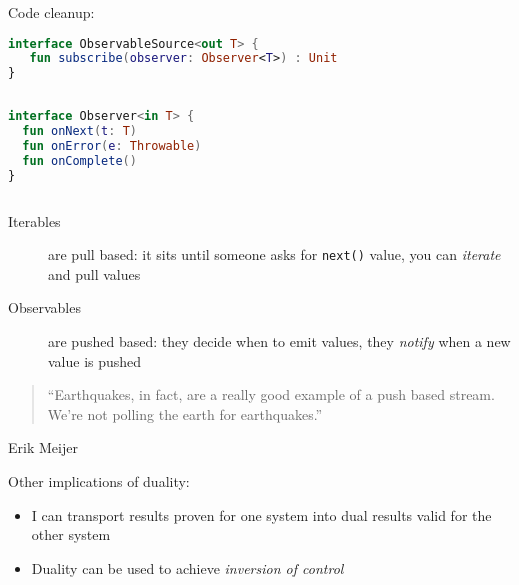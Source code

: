 \documentclass[10pt]{beamer}
\begin{document}
\begin{frame}[fragile]
Code cleanup:
\begin{lstlisting}[language=Kotlin, basicstyle=\ttfamily]
interface ObservableSource<out T> {
   fun subscribe(observer: Observer<T>) : Unit
}
\end{lstlisting}
\begin{columns}
\begin{column}{0.7\textwidth}
\begin{lstlisting}[language=Kotlin, basicstyle=\ttfamily]
interface Observer<in T> {
  fun onNext(t: T)
  fun onError(e: Throwable)
  fun onComplete()
}
\end{lstlisting}
\end{column}
\begin{column}{0.29\textwidth}
	\end{column}
\end{columns}

\end{frame}



\begin{frame}[fragile]
	\begin{description}
		\item[Iterables] are pull based: it sits until someone asks for \verb|next()| value, you can \emph{iterate} and pull values
		\item[Observables] are pushed based: they decide when to emit values, they \emph{notify} when a new value is pushed
	\end{description}
	\begin{quotation}
		``Earthquakes, in fact, are a really good example of a push based stream. We're not polling the earth for earthquakes.''
	\end{quotation}
	Erik Meijer
\end{frame}


\begin{frame}[fragile]
	Other implications of duality:
	\begin{itemize} 
		\item I can transport results proven for one system into dual results valid for the other system
		\item Duality can be used to achieve \emph{inversion of control}
	\end{itemize}
\end{frame}
\end{document}
